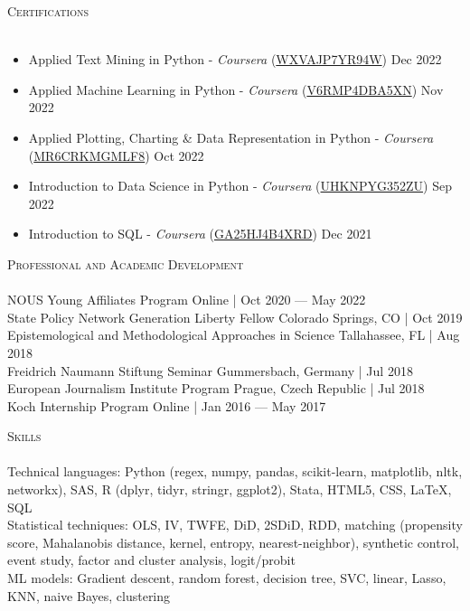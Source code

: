 \documentclass[a4paper,11pt]{article}
\newcommand{\lineunder} {
    \vspace*{-8pt} \\
    \hspace*{-18pt} \hrulefill \\
}
\newcommand{\header} [1] {
    {\hspace*{-18pt}\vspace*{6pt} \textsc{\large{#1}}}
    \vspace*{-6pt} \lineunder
}
\begin{document}
\vspace{1mm}
\header{Certifications}
\begin{itemize}
    \item Applied Text Mining in Python - \emph{Coursera} (\href{https://www.coursera.org/account/accomplishments/verify/WXVAJP7YR94W}{WXVAJP7YR94W}) \hfill Dec 2022
    \item Applied Machine Learning in Python - \emph{Coursera} (\href{https://www.coursera.org/account/accomplishments/certificate/V6RMP4DBA5XN}{V6RMP4DBA5XN}) \hfill Nov 2022
    \item Applied Plotting, Charting \& Data Representation in Python - \emph{Coursera} (\href{https://www.coursera.org/account/accomplishments/certificate/MR6CRKMGMLF8}{MR6CRKMGMLF8}) \hfill Oct 2022
    \item Introduction to Data Science in Python - \emph{Coursera} (\href{https://www.coursera.org/account/accomplishments/certificate/UHKNPYG352ZU}{UHKNPYG352ZU}) \hfill Sep 2022
    \item Introduction to SQL - \emph{Coursera} (\href{https://coursera.org/verify/GA25HJ4B4XRD}{GA25HJ4B4XRD}) \hfill Dec 2021
\end{itemize}
\vspace{1mm}
\header{Professional and Academic Development}

NOUS Young Affiliates Program \hfill Online | Oct 2020 --- May 2022 \\

State Policy Network Generation Liberty Fellow \hfill Colorado Springs, CO | Oct 2019 \\

Epistemological and Methodological Approaches in Science \hfill Tallahassee, FL | Aug 2018\\

Freidrich Naumann Stiftung Seminar \hfill Gummersbach, Germany | Jul 2018 \\

European Journalism Institute Program \hfill Prague, Czech Republic | Jul 2018 \\

Koch Internship Program \hfill Online | Jan 2016 --- May 2017

\vspace{1mm}
\header{Skills}
Technical languages: Python (regex, numpy, pandas, scikit-learn, matplotlib, nltk, networkx), SAS, R (dplyr, tidyr, stringr, ggplot2), Stata, HTML5, CSS, \LaTeX, SQL \\

Statistical techniques: OLS, IV, TWFE, DiD, 2SDiD, RDD, matching (propensity score, Mahalanobis distance, kernel, entropy, nearest-neighbor), synthetic control, event study, factor and cluster analysis, logit/probit \\

ML models: Gradient descent, random forest, decision tree, SVC, linear, Lasso, KNN, naive Bayes, clustering
\end{document}
